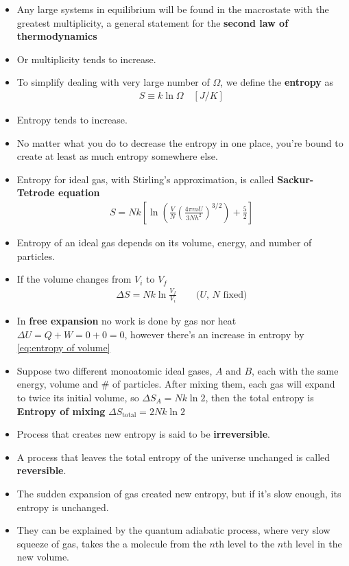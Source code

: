 \documentclass{book}
\begin{document}
\begin{itemize}
	\item Any large systems in equilibrium will be found in the macrostate with the greatest multiplicity,
	      a general statement for the \textbf{second law of thermodynamics}
	\item Or multiplicity tends to increase.
	\item To simplify dealing with very large number of $\Omega$, we define the \textbf{entropy} as
	      \begin{align}
		      \label{eq:entropy}
		      S \equiv k \ln{\Omega} \quad [\unit{J/K}]
	      \end{align}
	\item Entropy tends to increase.
	\item No matter what you do to decrease the entropy in one place, you're bound to create at least
	      as much entropy somewhere else.
	\item Entropy for ideal gas, with Stirling's approximation, is called
	      \textbf{Sackur-Tetrode equation}
	      \begin{align}
		      S = Nk \left[
			      \ln{ \left( \frac{V}{N} \left( \frac{4\pi m U}{3Nh^2} \right)^{3/2} \right) + \frac{5}{2}}
			      \right]
	      \end{align}
	\item Entropy of an ideal gas depends on its volume, energy, and number of particles.
	\item If the volume changes from $V_i$ to $V_f$
	      \begin{align}
		      \label{eq:entropy of volume}
		      \Delta{S} = Nk \ln{\frac{V_f}{V_i}} \qquad \text{($U$, $N$ fixed)}
	      \end{align}
	\item In \textbf{free expansion} no work is done by gas nor heat
	      $\Delta{U} = Q + W = 0 + 0 =0$, however there's an increase in entropy by
	      \eqref{eq:entropy of volume}
	\item  Suppose two different monoatomic ideal gases, $A$ and $B$,
	      each with the same energy, volume and \# of particles. After mixing them, each gas will expand
	      to twice its initial volume, so $\Delta{S_A} = Nk \ln{2}$, then the total entropy is
	      \textbf{Entropy of mixing} $\Delta{S_{\text{total}} = 2Nk \ln{2}}$
	\item Process that creates new entropy is said to be \textbf{irreversible}.

	\item A process that leaves the total entropy of the universe unchanged is called \textbf{reversible}.
	\item The sudden expansion of gas created new entropy, but if it's slow enough, its entropy is unchanged.
	\item They can be explained by the quantum adiabatic process, where very slow squeeze of gas, takes the a molecule
	      from the $n$th level to the $n$th level in the new volume.
\end{itemize}
\end{document}

